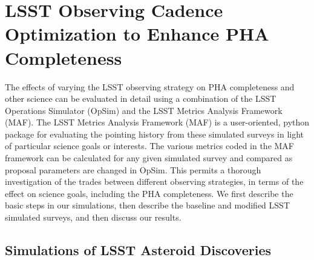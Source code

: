 \section{LSST Observing Cadence Optimization to Enhance PHA Completeness \label{sec:opsim}}

The effects of varying the LSST observing strategy on PHA completeness and other science can be evaluated in detail 
using a combination of the LSST Operations Simulator (OpSim) and the LSST Metrics Analysis Framework (MAF). 
The LSST Metrics Analysis Framework (MAF) is a user-oriented, python package for evaluating the pointing history 
from these simulated surveys in light of particular science goals or interests. The various metrics coded in the 
MAF framework can be calculated for any given simulated survey and compared as proposal parameters are changed 
in OpSim. This permits a thorough investigation of the trades between different observing strategies, in terms of the 
effect on science goals, including the PHA completeness.  We first describe the basic steps in our simulations,
then describe the baseline and modified LSST simulated surveys, and then discuss our results.


\subsection{Simulations of LSST Asteroid Discoveries} 

